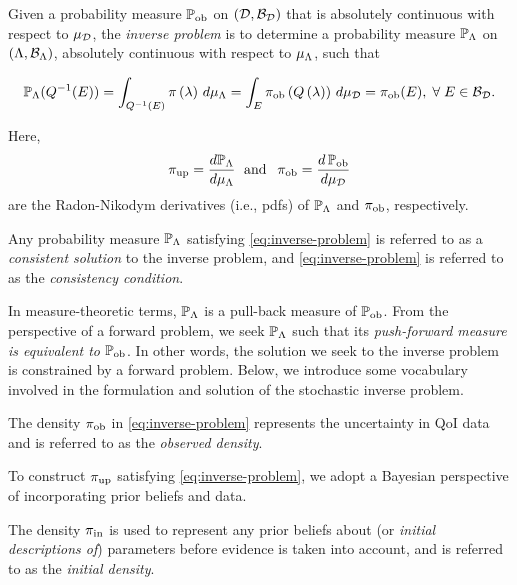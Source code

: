 \begin{defn}\label{defn:consistency}
Given a probability measure $\operatorname*{\mathbb{P}_{ob}}$ on $(\mathcal{D}, \mathcal{B}_{\mathcal{D}})$ that is absolutely continuous with respect to $\mu_{\mathcal{D}}$, the \emph{inverse problem} is to determine a probability measure $\mathbb{P}_{\Lambda}$ on $({\Lambda}, \mathcal{B}_{{\Lambda}})$, absolutely continuous with respect to $\mu_{{\Lambda}}$, such that

\begin{equation}\label{eq:inverse-problem}
\mathbb{P}_{\Lambda}(Q^{-1}(E)) = \int_{Q^{-1}(E)} \pi\left ( \lambda \right ) \, d\mu_{{\Lambda}} = \int_E \operatorname*{\pi_{ob}} \left ( Q\left ( \lambda \right ) \right ) \, d\mu_{\mathcal{D}} = \operatorname*{\pi_{ob}}(E), \; \forall \; E \in \mathcal{B}_{\mathcal{D}}.
\end{equation} 

Here, 
\begin{equation*}
\operatorname*{\pi_{up}} = \frac{d\mathbb{P}_{\Lambda}}{d\mu_{{\Lambda}}} \;\text{ and }\; \operatorname*{\pi_{ob}} = \frac{d\operatorname*{\mathbb{P}_{ob}}}{d\mu_{\mathcal{D}}}
\end{equation*}
are the Radon-Nikodym derivatives (i.e., pdfs) of $\mathbb{P}_{\Lambda}$ and $\operatorname*{\pi_{ob}}$, respectively. 

Any probability measure $\mathbb{P}_{\Lambda}$ satisfying \eqref{eq:inverse-problem} is referred to as a \emph{consistent solution} to the inverse problem, and \eqref{eq:inverse-problem} is referred to as the \emph{consistency condition}.
\end{defn}

In measure-theoretic terms, $\mathbb{P}_{\Lambda}$ is a pull-back measure of $\operatorname*{\mathbb{P}_{ob}}$.
From the perspective of a forward problem, we seek $\mathbb{P}_{\Lambda}$ such that its \emph{push-forward measure is equivalent to} $\operatorname*{\mathbb{P}_{ob}}$. 
In other words, the solution we seek to the inverse problem is constrained by a forward problem. 
Below, we introduce some vocabulary involved in the formulation and solution of the stochastic inverse problem.

\begin{defn}\label{defn:obsden}
The density $\operatorname*{\pi_{ob}}$ in \eqref{eq:inverse-problem} represents the uncertainty in QoI data and is referred to as the \emph{observed density}.
\end{defn}

To construct $\operatorname*{\pi_{up}}$ satisfying \eqref{eq:inverse-problem}, we adopt a Bayesian perspective of incorporating prior beliefs and data. 

\begin{defn}\label{defn:initial}
The density $\operatorname*{\pi_{in}}$ is used to represent any prior beliefs about (or \emph{initial descriptions of}) parameters before evidence is taken into account, and is referred to as the \emph{initial density}.
\end{defn}

